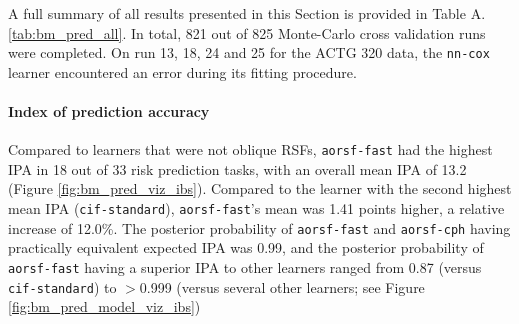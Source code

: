 \documentclass{article}\usepackage[]{graphicx}\usepackage[]{xcolor}
\newcommand{\tabrefAppendix}[1]{Table A.\ref{#1}}
\begin{document}
A full summary of all results presented in this Section is provided in \tabrefAppendix{tab:bm_pred_all}. In total, 821 out of 825 Monte-Carlo cross validation runs were completed. On run 13, 18, 24 and 25 for the ACTG 320 data, the \texttt{nn-cox} learner encountered an error during its fitting procedure.

\paragraph{Index of prediction accuracy}

Compared to learners that were not oblique RSFs, \texttt{aorsf-fast} had the highest IPA in 18 out of 33 risk prediction tasks, with an overall mean IPA of 13.2 (Figure \ref{fig:bm_pred_viz_ibs}). Compared to the learner with the second highest mean IPA (\texttt{cif-standard}), \texttt{aorsf-fast}'s mean was 1.41 points higher, a relative increase of 12.0\%. The posterior probability of \texttt{aorsf-fast} and \texttt{aorsf-cph} having practically equivalent expected IPA was 0.99, and the posterior probability of \texttt{aorsf-fast} having a superior IPA to other learners ranged from 0.87 (versus \texttt{cif-standard}) to $>$0.999 (versus several other learners; see Figure \ref{fig:bm_pred_model_viz_ibs})
\end{document}
